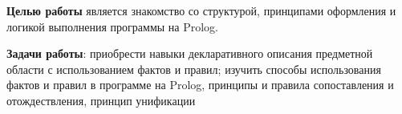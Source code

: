 \Introduction

\textbf{Целью работы} является знакомство со структурой, принципами оформления и логикой выполнения программы на Prolog.

\textbf{Задачи работы}: приобрести навыки декларативного описания предметной области с использованием фактов и правил; изучить способы использования фактов и правил в программе на Prolog, принципы  и правила сопоставления и отождествления, принцип унификации



